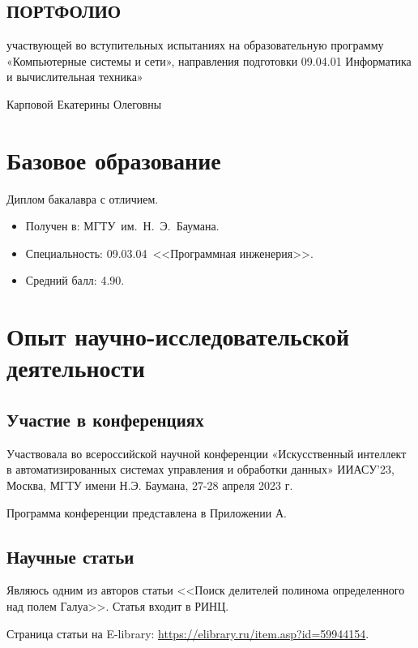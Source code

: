 \documentclass[14pt]{extarticle}
\begin{document}
\pagestyle{empty}

\begin{center}
\section*{ПОРТФОЛИО}

участвующей во вступительных испытаниях на образовательную программу
«Компьютерные системы и сети», направления подготовки 09.04.01
Информатика и вычислительная техника»

Карповой Екатерины Олеговны
\end{center}	

\section{Базовое образование}

Диплом бакалавра с отличием.

\begin{itemize}
	\item Получен в: МГТУ~им.~Н.~Э.~Баумана.
	\item Специальность: 09.03.04~<<Программная инженерия>>. 
	\item Средний балл: 4.90.
\end{itemize}

\section{Опыт научно-исследовательской деятельности}

\subsection{Участие в конференциях}

Участвовала во всероссийской научной конференции «Искусственный интеллект в автоматизированных системах управления и обработки данных» ИИАСУ'23, Москва, МГТУ имени Н.Э. Баумана, 27-28 апреля 2023 г.

Программа конференции представлена в Приложении А.

\subsection{Научные статьи}

Являюсь одним из авторов статьи <<Поиск делителей полинома определенного над полем Галуа>>. Статья входит в РИНЦ.

Страница статьи на E-library: \url{https://elibrary.ru/item.asp?id=59944154}.
\end{document}

